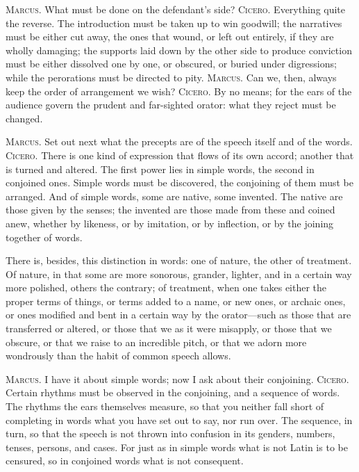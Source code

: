  \textsc{Marcus.} What must be done on the defendant's side? \textsc{Cicero.} Everything quite the reverse. The introduction must be taken up to win goodwill; the narratives must be either cut away, the ones that wound, or left out entirely, if they are wholly damaging; the supports laid down by the other side to produce conviction must be either dissolved one by one, or obscured, or buried under digressions; while the perorations must be directed to pity. \textsc{Marcus.} Can we, then, always keep the order of arrangement we wish? \textsc{Cicero.} By no means; for the ears of the audience govern the prudent and far-sighted orator: what they reject must be changed.

 \textsc{Marcus.} Set out next what the precepts are of the speech itself and of the words. \textsc{Cicero.} There is one kind of expression that flows of its own accord; another that is turned and altered. The first power lies in simple words, the second in conjoined ones. Simple words must be discovered, the conjoining of them must be arranged. And of simple words, some are native, some invented. The native are those given by the senses; the invented are those made from these and coined anew, whether by likeness, or by imitation, or by inflection, or by the joining together of words.

 There is, besides, this distinction in words: one of nature, the other of treatment. Of nature, in that some are more sonorous, grander, lighter, and in a certain way more polished, others the contrary; of treatment, when one takes either the proper terms of things, or terms added to a name, or new ones, or archaic ones, or ones modified and bent in a certain way by the orator—such as those that are transferred or altered, or those that we as it were misapply, or those that we obscure, or that we raise to an incredible pitch, or that we adorn more wondrously than the habit of common speech allows.

 \textsc{Marcus.} I have it about simple words; now I ask about their conjoining. \textsc{Cicero.} Certain rhythms must be observed in the conjoining, and a sequence of words. The rhythms the ears themselves measure, so that you neither fall short of completing in words what you have set out to say, nor run over. The sequence, in turn, so that the speech is not thrown into confusion in its genders, numbers, tenses, persons, and cases. For just as in simple words what is not Latin is to be censured, so in conjoined words what is not consequent.


